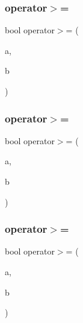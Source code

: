\mbox{\label{class_f_l___f_p_a496bb5bc687d589a5ec23c0b81dc5fb2}} 
\subsubsection{\texorpdfstring{operator$>$=}{operator>=}\hspace{0.1cm}{\footnotesize\ttfamily [1/3]}}
{\footnotesize\ttfamily bool operator$>$= (\begin{DoxyParamCaption}\item[{const \hyperlink{class_f_l___f_p}{F\+L\+\_\+\+FP} \&}]{a,  }\item[{const \hyperlink{class_f_l___f_p}{F\+L\+\_\+\+FP} \&}]{b }\end{DoxyParamCaption})\hspace{0.3cm}{\ttfamily [friend]}}

\mbox{\label{class_f_l___f_p_ace9ff2ae86cfecb59b601ef983b5189d}} 
\subsubsection{\texorpdfstring{operator$>$=}{operator>=}\hspace{0.1cm}{\footnotesize\ttfamily [2/3]}}
{\footnotesize\ttfamily bool operator$>$= (\begin{DoxyParamCaption}\item[{const \hyperlink{class_f_l___f_p}{F\+L\+\_\+\+FP} \&}]{a,  }\item[{const double \&}]{b }\end{DoxyParamCaption})\hspace{0.3cm}{\ttfamily [friend]}}

\mbox{\label{class_f_l___f_p_a1f7bf9f00e36c130033949619f5261dd}} 
\subsubsection{\texorpdfstring{operator$>$=}{operator>=}\hspace{0.1cm}{\footnotesize\ttfamily [3/3]}}
{\footnotesize\ttfamily bool operator$>$= (\begin{DoxyParamCaption}\item[{const double \&}]{a,  }\item[{const \hyperlink{class_f_l___f_p}{F\+L\+\_\+\+FP} \&}]{b }\end{DoxyParamCaption})\hspace{0.3cm}{\ttfamily [friend]}}



